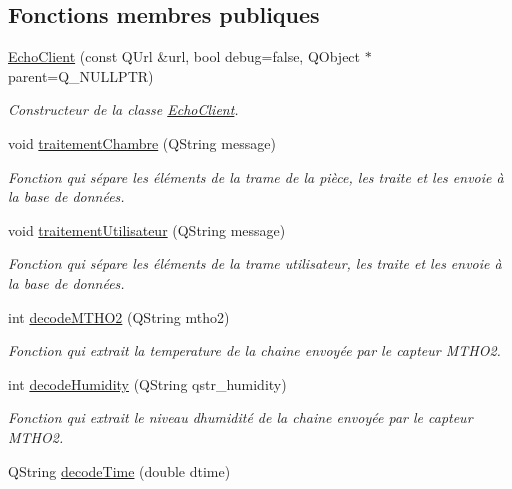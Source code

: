 \subsection*{Fonctions membres publiques}
\begin{DoxyCompactItemize}
\item 
\hyperlink{classEchoClient_a77a327e3a287f5797820cd5265164593}{Echo\+Client} (const Q\+Url \&url, bool debug=false, Q\+Object $\ast$parent=Q\+\_\+\+N\+U\+L\+L\+P\+TR)
\begin{DoxyCompactList}\small\item\em Constructeur de la classe \hyperlink{classEchoClient}{Echo\+Client}. \end{DoxyCompactList}\item 
void \hyperlink{classEchoClient_ac834f3a4331b8a0674a3614cf4513b9a}{traitement\+Chambre} (Q\+String message)
\begin{DoxyCompactList}\small\item\em Fonction qui sépare les éléments de la trame de la pièce, les traite et les envoie à la base de données. \end{DoxyCompactList}\item 
void \hyperlink{classEchoClient_a79508ca23964331b9b189a5282245d2d}{traitement\+Utilisateur} (Q\+String message)
\begin{DoxyCompactList}\small\item\em Fonction qui sépare les éléments de la trame utilisateur, les traite et les envoie à la base de données. \end{DoxyCompactList}\item 
int \hyperlink{classEchoClient_acf8a95fc397766e5429fc2cf7bd1f54d}{decode\+M\+T\+H\+O2} (Q\+String mtho2)
\begin{DoxyCompactList}\small\item\em Fonction qui extrait la temperature de la chaine envoyée par le capteur M\+T\+H\+O2. \end{DoxyCompactList}\item 
int \hyperlink{classEchoClient_ab22fb89d56621f22e7547ed365f94bb5}{decode\+Humidity} (Q\+String qstr\+\_\+humidity)
\begin{DoxyCompactList}\small\item\em Fonction qui extrait le niveau d\textquotesingle{}humidité de la chaine envoyée par le capteur M\+T\+H\+O2. \end{DoxyCompactList}\item 
Q\+String \hyperlink{classEchoClient_a2463696ad18476d25d9e8eac47e65436}{decode\+Time} (double dtime)

\end{DoxyCompactItemize}
